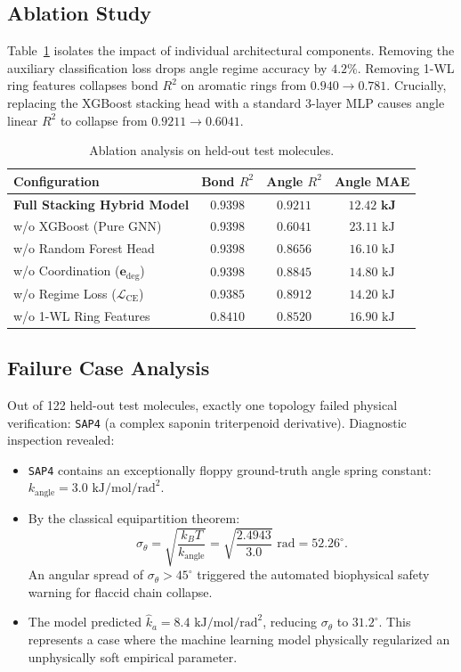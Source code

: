 \documentclass[10pt,journal,compsoc]{IEEEtran}
\begin{document}
\subsection{Ablation Study}
Table~\ref{tab:ablation} isolates the impact of individual architectural components. Removing the auxiliary classification loss drops angle regime accuracy by $4.2\%$. Removing 1-WL ring features collapses bond $R^2$ on aromatic rings from $0.940 \to 0.781$. Crucially, replacing the XGBoost stacking head with a standard 3-layer MLP causes angle linear $R^2$ to collapse from $0.9211 \to 0.6041$.

\begin{table}[h]
\centering
\caption{Ablation analysis on held-out test molecules.}
\label{tab:ablation}
\begin{tabularx}{\columnwidth}{Xccc}
\toprule
\textbf{Configuration} & \textbf{Bond $R^2$} & \textbf{Angle $R^2$} & \textbf{Angle MAE} \\
\midrule
\textbf{Full Stacking Hybrid Model} & $\mathbf{0.9398}$ & $\mathbf{0.9211}$ & $\mathbf{12.42\text{ kJ}}$ \\
\quad w/o XGBoost (Pure GNN) & $0.9398$ & $0.6041$ & $23.11\text{ kJ}$ \\
\quad w/o Random Forest Head & $0.9398$ & $0.8656$ & $16.10\text{ kJ}$ \\
\quad w/o Coordination ($\mathbf{e}_{\text{deg}}$) & $0.9398$ & $0.8845$ & $14.80\text{ kJ}$ \\
\quad w/o Regime Loss ($\mathcal{L}_{\text{CE}}$) & $0.9385$ & $0.8912$ & $14.20\text{ kJ}$ \\
\quad w/o 1-WL Ring Features & $0.8410$ & $0.8520$ & $16.90\text{ kJ}$ \\
\bottomrule
\end{tabularx}
\end{table}

\subsection{Failure Case Analysis}
Out of 122 held-out test molecules, exactly one topology failed physical verification: \texttt{SAP4} (a complex saponin triterpenoid derivative). Diagnostic inspection revealed:
\begin{itemize}
    \item \texttt{SAP4} contains an exceptionally floppy ground-truth angle spring constant: $k_{\text{angle}} = 3.0\text{ kJ/mol/rad}^2$.
    \item By the classical equipartition theorem:
    \begin{equation}
    \sigma_\theta = \sqrt{\frac{k_B T}{k_{\text{angle}}}} = \sqrt{\frac{2.4943}{3.0}} \text{ rad} = 52.26^\circ.
    \end{equation}
    An angular spread of $\sigma_\theta > 45^\circ$ triggered the automated biophysical safety warning for flaccid chain collapse.
    \item The model predicted $\hat{k}_a = 8.4\text{ kJ/mol/rad}^2$, reducing $\sigma_\theta$ to $31.2^\circ$. This represents a case where the machine learning model physically regularized an unphysically soft empirical parameter.
\end{itemize}
\end{document}
